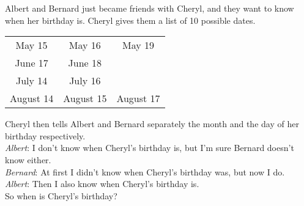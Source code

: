 \documentclass[12pt,a4paper,article,english,firamath]{nsi}
\begin{document}
\maketitle


\begin{exercice}[]
    Albert and Bernard just became friends with Cheryl, and they want to know when her birthday is. Cheryl gives them a list of 10 possible dates.

    \tabstyle[UGLiRed]
    \begin{center}
        \begin{tabular}{c|c|c}
            May 15    & May 16    & May 19    \\

            June 17   & June 18   &           \\

            July 14   & July 16   &           \\

            August 14 & August 15 & August 17 \\
        \end{tabular}
    \end{center}


    Cheryl then tells Albert and Bernard separately the month and the day of her birthday respectively.\\

    \textit{Albert}: I don't know when Cheryl's birthday is, but I'm sure Bernard doesn't know either.\\

    \textit{Bernard}: At first I didn't know when Cheryl's birthday was, but now I do.\\

    \textit{Albert}: Then I also know when Cheryl's birthday is.\\

    So when is Cheryl's birthday?
\end{exercice}
\end{document}
